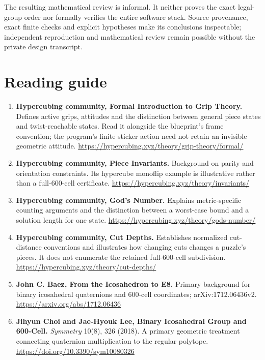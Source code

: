 \documentclass[
  10pt,
  a4paper,
]{article}
\providecommand{\tightlist}{%
  \setlength{\itemsep}{0pt}\setlength{\parskip}{0pt}}
\begin{document}
The resulting mathematical review is informal. It neither proves the
exact legal-group order nor formally verifies the entire software stack.
Source provenance, exact finite checks and explicit hypotheses make its
conclusions inspectable; independent reproduction and mathematical
review remain possible without the private design transcript.

\newpage

\section{Reading guide}\label{reading-guide}

\begin{enumerate}
\def\labelenumi{\arabic{enumi}.}
\tightlist
\item
  \textbf{Hypercubing community, Formal Introduction to Grip Theory.}
  Defines active grips, attitudes and the distinction between general
  piece states and twist-reachable states. Read it alongside the
  blueprint's frame convention; the program's finite sticker action need
  not retain an invisible geometric attitude.
  \url{https://hypercubing.xyz/theory/grip-theory/formal/}
\item
  \textbf{Hypercubing community, Piece Invariants.} Background on parity
  and orientation constraints. Its hypercube monoflip example is
  illustrative rather than a full-600-cell certificate.
  \url{https://hypercubing.xyz/theory/invariants/}
\item
  \textbf{Hypercubing community, God's Number.} Explains metric-specific
  counting arguments and the distinction between a worst-case bound and
  a solution length for one state.
  \url{https://hypercubing.xyz/theory/gods-number/}
\item
  \textbf{Hypercubing community, Cut Depths.} Establishes normalized
  cut-distance conventions and illustrates how changing cuts changes a
  puzzle's pieces. It does not enumerate the retained full-600-cell
  subdivision. \url{https://hypercubing.xyz/theory/cut-depths/}
\item
  \textbf{John C. Baez, From the Icosahedron to E8.} Primary background
  for binary icosahedral quaternions and 600-cell coordinates;
  arXiv:1712.06436v2. \url{https://arxiv.org/abs/1712.06436}
\item
  \textbf{Jihyun Choi and Jae-Hyouk Lee, Binary Icosahedral Group and
  600-Cell.} \emph{Symmetry} 10(8), 326 (2018). A primary geometric
  treatment connecting quaternion multiplication to the regular
  polytope. \url{https://doi.org/10.3390/sym10080326}

\end{enumerate}
\end{document}
